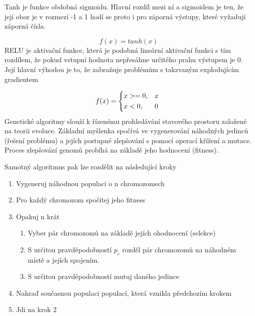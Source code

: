 Tanh je funkce obdobná sigmoidu. Hlavní rozdíl mezi ní a sigmoidem je ten, že její obor je v rozmezí -1 a 1 hodí se proto i pro záporná výstupy, které vyžadují záporná čísla. \cite[s.~67]{fundementalsOfDeepLearning}

$$f(x) = tanh(x)$$
RELU je aktivační funkce, která je podobná lineární aktivační funkci s tím rozdílem, že pokud vstupní hodnota nepřesáhne určitého prahu výstupem je 0. Její hlavní výhodou je to, že zabraňuje problémům s takzvaným explodujícím gradientem \cite[s.~69]{fundementalsOfDeepLearning} \\

\[ 
f(x) = 
\begin{dcases*} 
\text{$x>=0$,} & $x$ \\ 
\text{$x<0$,} & 0 
\end{dcases*} 
\]
Genetické algoritmy slouží k řízenému prohledávání stavového prostoru založené na teorii evoluce. 
Základní myšlenka spočívá ve vygenerování náhodných jedinců (řešení problému) a jejích postupné zlepšování s pomocí operací křížení a mutace. Proces zlepšování genomů probíhá na základě jeho hodnocení (fitness).

Samotný algoritmus pak lze rozdělit na následující kroky \cite[s.~12]{geneticAlgorithms}

\begin{enumerate}
	\item Vygeneruj náhodnou populaci o n chromozomech
	\item Pro každý chromozom spočítej jeho fitness
	\item Opakuj n krát
	\begin{enumerate}
		\item Vyber pár chromozomů na základě jejích ohodnocení (selekce)
		\item S určitou pravděpodobností $p_c$ rozděl pár chromozomů na náhodném místě a jejích spojením.
		\item S určitou pravděpodobností mutuj daného jedince
	\end{enumerate}
	\item Nahraď současnou populaci populací, která vznikla předchozím krokem
	\item Jdi na krok 2
\end{enumerate}

